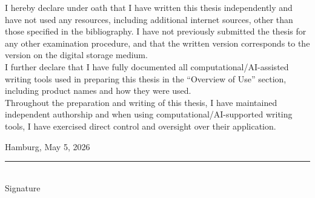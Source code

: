 \cleardoublepage
\thispagestyle{empty}
\vspace{1cm}
\noindent I hereby declare under oath that I have written this thesis independently and have not used 
any resources, including additional internet sources, other than those specified in the 
bibliography. I have not previously submitted the thesis for any other examination procedure, 
and that the written version corresponds to the version on the digital storage medium. \\
I further declare that I have fully documented all computational/AI-assisted writing tools used 
in preparing this thesis in the “Overview of Use” section, including product names and how 
they were used. \\
Throughout the preparation and writing of this thesis, I have maintained independent 
authorship and when using computational/AI-supported writing tools, I have exercised direct 
control and oversight over their application.
\vspace{3cm}

\noindent
\begin{minipage}[t]{0.45\textwidth}
\raggedright
Hamburg, May 5, 2026
\end{minipage}
\hfill
\begin{minipage}[t]{0.45\textwidth}
\raggedleft
\rule{5cm}{0.4pt}\\
Signature
\end{minipage}